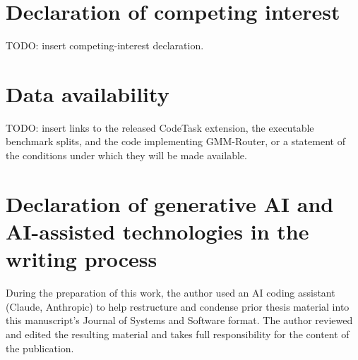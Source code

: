 \documentclass[a4paper,fleqn]{cas-dc}
\begin{document}
\section*{Declaration of competing interest}
TODO: insert competing-interest declaration.

\section*{Data availability}
TODO: insert links to the released CodeTask extension, the executable benchmark splits, and the code implementing GMM-Router, or a statement of the conditions under which they will be made available.

\section*{Declaration of generative AI and AI-assisted technologies in the writing process}
During the preparation of this work, the author used an AI coding assistant (Claude, Anthropic) to help restructure and condense prior thesis material into this manuscript's Journal of Systems and Software format. The author reviewed and edited the resulting material and takes full responsibility for the content of the publication.



\end{document}
